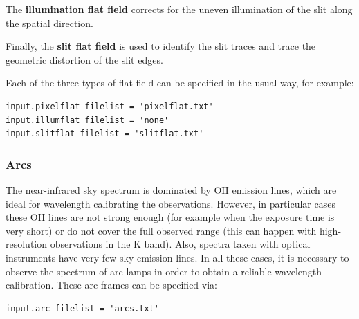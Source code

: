 \documentclass[a4paper, notitlepage]{article}
\begin{document}
The \textbf{illumination flat field} corrects for the uneven illumination of the slit along the spatial direction.

Finally, the \textbf{slit flat field} is used to identify the slit traces and trace the geometric distortion of the slit edges.

Each of the three types of flat field can be specified in the usual way, for example:
\begin{lstlisting}
input.pixelflat_filelist = 'pixelflat.txt'
input.illumflat_filelist = 'none'
input.slitflat_filelist = 'slitflat.txt'
\end{lstlisting}


\subsubsection{Arcs}
The near-infrared sky spectrum is dominated by OH emission lines, which are ideal for wavelength calibrating the observations. However, in particular cases these OH lines are not strong enough (for example when the exposure time is very short) or do not cover the full observed range (this can happen with high-resolution observations in the K band). Also, spectra taken with optical instruments have very few sky emission lines. In all these cases, it is necessary to observe the spectrum of arc lamps in order to obtain a reliable wavelength calibration. These arc frames can be specified via:
\begin{lstlisting}
input.arc_filelist = 'arcs.txt'
\end{lstlisting}
\end{document}
